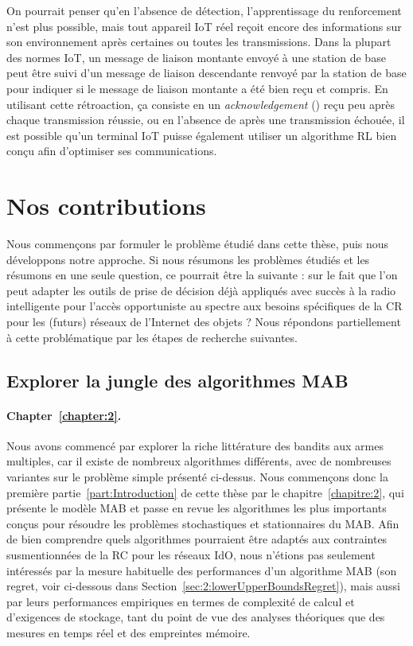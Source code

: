 \begin{resume_fr}
On pourrait penser qu'en l'absence de détection, l'apprentissage du renforcement n'est plus possible, mais tout appareil IoT réel reçoit encore des informations sur son environnement après certaines ou toutes les transmissions.
Dans la plupart des normes IoT, un message de liaison montante envoyé à une station de base peut être suivi d'un message de liaison descendante renvoyé par la station de base pour indiquer si le message de liaison montante a été bien reçu et compris.
%
En utilisant cette rétroaction, ça consiste en un \emph{acknowledgement} (\Ack) reçu peu après chaque transmission réussie, ou en l'absence de \Ack{} après une transmission échouée, il est possible qu'un terminal IoT puisse également utiliser un algorithme RL bien conçu afin d'optimiser ses communications.



\section*{Nos contributions}
\label{sec:1:contributions}

Nous commençons par formuler le problème étudié dans cette thèse, puis nous développons notre approche.
%
Si nous résumons les problèmes étudiés et les résumons en une seule question, ce pourrait être la suivante :
\Insister sur le fait que l'on peut adapter les outils de prise de décision déjà appliqués avec succès à la radio intelligente pour l'accès opportuniste au spectre aux besoins spécifiques de la CR pour les (futurs) réseaux de l'Internet des objets ?
%
Nous répondons partiellement à cette problématique par les étapes de recherche suivantes.



\subsection*{Explorer la jungle des algorithmes MAB}

\paragraph{Chapter~\ref{chapter:2}.}
%
Nous avons commencé par explorer la riche littérature des bandits aux armes multiples,
car il existe de nombreux algorithmes différents, avec de nombreuses variantes sur le problème simple présenté ci-dessus.
Nous commençons donc la première partie~\ref{part:Introduction} de cette thèse par le chapitre~\ref{chapitre:2}, qui présente le modèle MAB et passe en revue les algorithmes les plus importants conçus pour résoudre les problèmes stochastiques et stationnaires du MAB.
%
Afin de bien comprendre quels algorithmes pourraient être adaptés aux contraintes susmentionnées de la RC pour les réseaux IdO,
nous n'étions pas seulement intéressés par la mesure habituelle des performances d'un algorithme MAB (son regret, voir ci-dessous dans Section~\ref{sec:2:lowerUpperBoundsRegret}),
mais aussi par leurs performances empiriques en termes de complexité de calcul et d'exigences de stockage, tant du point de vue des analyses théoriques que des mesures en temps réel et des empreintes mémoire.



\end{resume_fr}
